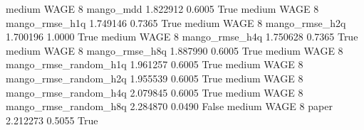     medium     WAGE                 8             mango_mdd   1.822912      0.6005    True
    medium     WAGE                 8        mango_rmse_h1q   1.749146      0.7365    True
    medium     WAGE                 8        mango_rmse_h2q   1.700196      1.0000    True
    medium     WAGE                 8        mango_rmse_h4q   1.750628      0.7365    True
    medium     WAGE                 8        mango_rmse_h8q   1.887990      0.6005    True
    medium     WAGE                 8 mango_rmse_random_h1q   1.961257      0.6005    True
    medium     WAGE                 8 mango_rmse_random_h2q   1.955539      0.6005    True
    medium     WAGE                 8 mango_rmse_random_h4q   2.079845      0.6005    True
    medium     WAGE                 8 mango_rmse_random_h8q   2.284870      0.0490   False
    medium     WAGE                 8                 paper   2.212273      0.5055    True